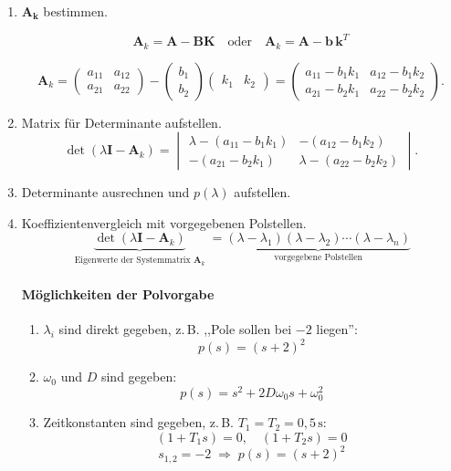 \documentclass[12pt]{article}
\begin{document}
\begin{enumerate}[label=\arabic*.]
	\item \(\mathbf{A_k}\) bestimmen.
	
	\[
	\mathbf{A}_k = \mathbf{A} - \mathbf{B}\mathbf{K} \quad \text{oder} \quad \mathbf{A}_k = \mathbf{A} - \mathbf{b}\,\mathbf{k}^T
	\]
	
	\begin{equation}\mathbf{A}_k=\begin{pmatrix} a_{11} & a_{12} \\ a_{21} & a_{22} \end{pmatrix}-\begin{pmatrix} b_{1} \\ b_{2} \end{pmatrix}\begin{pmatrix} k_{1} & k_{2} \end{pmatrix}=\begin{pmatrix} a_{11} - b_1 k_1 & a_{12} - b_1 k_2 \\ a_{21} - b_2 k_1 & a_{22} - b_2 k_2 \end{pmatrix}.\end{equation}
	\item Matrix für Determinante aufstellen.
	\begin{equation}
		\det\!
		\left(\lambda\mathbf{I}-\mathbf{A}_k\right)
		=
		\begin{vmatrix}
			\lambda-(a_{11} - b_1 k_1) & -(a_{12} - b_1 k_2) \\
			-(a_{21} - b_2 k_1) & \lambda-(a_{22} - b_2 k_2)
		\end{vmatrix}.
	\end{equation}
	\item Determinante ausrechnen und \(p(\lambda) \) aufstellen.
	\item Koeffizientenvergleich mit vorgegebenen Polstellen.
	\begin{equation}
		\underbrace{\det\!
		\left(\lambda\mathbf{I}-\mathbf{A}_k\right)}_{\substack{\text{Eigenwerte der Systemmatrix } \mathbf{A}_k}}
		=
		\underbrace{(\lambda - \lambda_1)(\lambda - \lambda_2)\cdots(\lambda - \lambda_n)}_{\text{vorgegebene Polstellen}}
	\end{equation}
	\paragraph{Möglichkeiten der Polvorgabe}
	\begin{enumerate}[label=\Roman*.]
		\item \(\lambda_i\) sind direkt gegeben, z.\,B. ,,Pole sollen bei \(-2\) liegen'':
		\[
		p(s)=(s+2)^2
		\]
		\item \(\omega_0\) und \(D\) sind gegeben:
		\[
		p(s)=s^2+2D\omega_0 s+\omega_0^2
		\]
		\item Zeitkonstanten sind gegeben, z.\,B. \(T_1=T_2=0{,}5\,\mathrm{s}\):
		\[
		(1+T_1s)=0,\quad (1+T_2s)=0
		\]
		\[
		s_{1,2}=-2 \;\Rightarrow\; p(s)=(s+2)^2
		\]
	\end{enumerate}
	
\end{enumerate}
\end{document}

